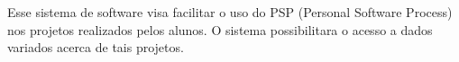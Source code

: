 \-Esse sistema de software visa facilitar o uso do \-P\-S\-P (\-Personal \-Software \-Process) nos projetos realizados pelos alunos. \-O sistema possibilitara o acesso a dados variados acerca de tais projetos. 